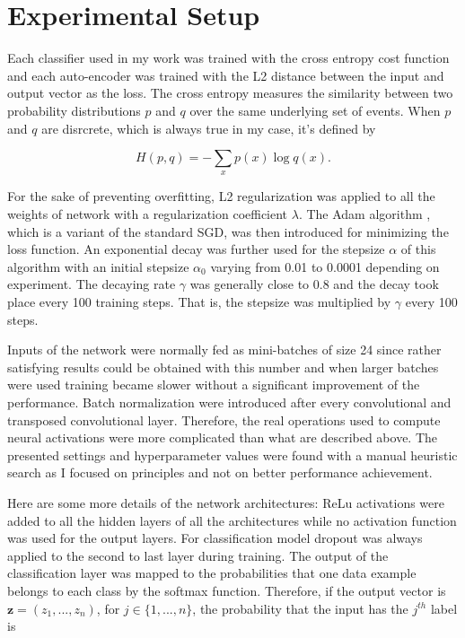 \section{Experimental Setup} \label{section:exp}

Each classifier used in my work was trained with the cross entropy cost
function and each auto-encoder was trained with the L2 distance between
the input and output vector as the loss.
The cross entropy measures the similarity between two probability
distributions $p$ and $q$ over the same underlying set of events.
When $p$ and $q$ are disrcrete, which is always true in my case, it's
defined by

\[H(p,q) = -\sum_xp(x)\log q(x).\]

For the sake of preventing overfitting, L2
regularization \cite{Y. Bengio 2012} was applied to all the weights of
network with a regularization coefficient $\lambda$.
The Adam algorithm \cite{D. Kingma 2014}, which is a variant of the
standard SGD, was then introduced for minimizing the loss function.
An exponential decay was further used for the stepsize $\alpha$ of this
algorithm with an initial stepsize $\alpha_0$ varying from 0.01 to 0.0001
depending on experiment. The decaying rate $\gamma$
was generally close to 0.8 and the decay took place every 100
training steps. That is, the stepsize was multiplied by $\gamma$ every
100 steps.

Inputs of the network were normally fed as mini-batches of size 24
since rather satisfying results could be obtained with this
number and when larger batches were used training became slower
without a significant improvement of the performance.
Batch normalization \cite{S. Ioffe 2015} were introduced after every
convolutional and transposed convolutional layer. Therefore, the real
operations used to compute neural activations were more complicated
than what are described above. The presented settings and hyperparameter
values were found with a manual heuristic search as I focused on
principles and not on better performance achievement.

Here are some more details of the network architectures: ReLu activations 
were added to all the hidden layers of all the architectures
\cite{A. Krizhevsky 2012} while no activation function was used for
the output layers.
For classification model dropout \cite{N. Srivastava 2014}
was always applied to the second to last layer during training.
The output of the classification layer was mapped to the probabilities
that one data example belongs to each class by the softmax function.
Therefore, if the output vector is $\mathbf{z} = (z_1, ..., z_n)$,
for $j \in \{1,...,n\}$, the probability that the input has the $j^{th}$
label is

